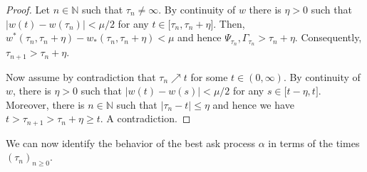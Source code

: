 \documentclass[11pt]{scrartcl}
\begin{document}
\begin{proof}
Let $n\in\mathbb{N}$ such that $\tau_{n}\neq\infty$. By continuity of $w$ there
is $\eta>0$ such that $|w(t)-w(\tau_{n})|<\mu/2$ for any $t\in\lbrack \tau_{n}%
,\tau_{n}+\eta]$. Then, $w^{\ast}(\tau_{n},\tau_{n}+\eta)-w_{\ast}(\tau_{n},\tau_{n}%
+\eta)<\mu$ and hence $\Psi_{\tau_{n}},\Gamma_{\tau_{n}}>\tau_{n}+\eta$. Consequently,
$\tau_{n+1}>\tau_{n}+\eta$.

Now assume by contradiction that $\tau_{n}\nearrow t$ for some $t\in(0,\infty)$.
By continuity of $w$, there is $\eta>0$ such that $|w(t)-w(s)|<\mu/2$ for any
$s\in\lbrack t-\eta,t]$. Moreover, there is $n\in\mathbb{N}$ such that
$|\tau_{n}-t|\leq\eta$ and hence we have $t>\tau_{n+1}>\tau_{n}+\eta\geq t$. A contradiction.
\end{proof}
We can now identify the behavior of the best ask process $\alpha$ in terms
of the times $(\tau_n)_{n\geq 0}$.
\end{document}
